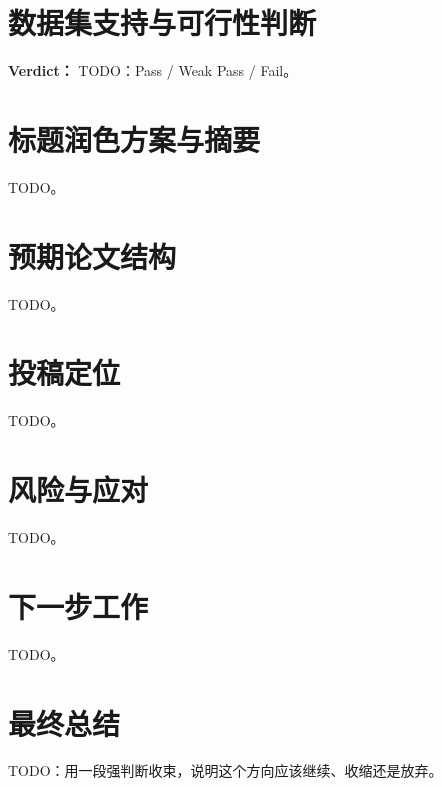 \documentclass[UTF8,a4paper,11pt]{ctexart}
\begin{document}
\section{数据集支持与可行性判断}

\begin{tcolorbox}[warnbox,title=可行性结论]
\textbf{Verdict：} TODO：Pass / Weak Pass / Fail。
\end{tcolorbox}

\section{标题润色方案与摘要}

TODO。

\section{预期论文结构}

TODO。

\section{投稿定位}

TODO。

\section{风险与应对}

TODO。

\section{下一步工作}

TODO。

\section{最终总结}

\begin{tcolorbox}[keybox,title=最终总结]
TODO：用一段强判断收束，说明这个方向应该继续、收缩还是放弃。
\end{tcolorbox}
\end{document}
